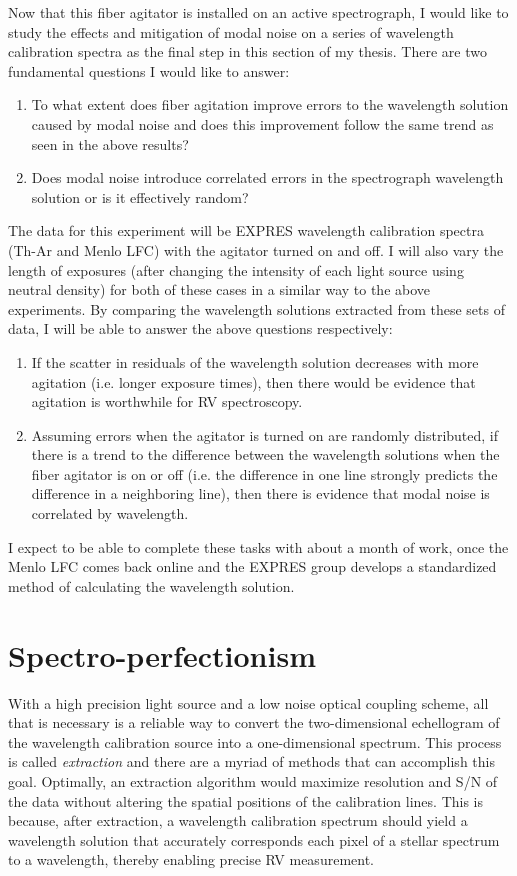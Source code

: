 \documentclass[11pt]{article}
\begin{document}
Now that this fiber agitator is installed on an active spectrograph, I would like to study the effects and mitigation of modal noise on a series of wavelength calibration spectra as the final step in this section of my thesis. There are two fundamental questions I would like to answer:
\begin{enumerate}
    \item To what extent does fiber agitation improve errors to the wavelength solution caused by modal noise and does this improvement follow the same trend as seen in the above results?
    \item Does modal noise introduce correlated errors in the spectrograph wavelength solution or is it effectively random?
\end{enumerate}
The data for this experiment will be EXPRES wavelength calibration spectra (Th-Ar and Menlo LFC) with the agitator turned on and off. I will also vary the length of exposures (after changing the intensity of each light source using neutral density) for both of these cases in a similar way to the above experiments. By comparing the wavelength solutions extracted from these sets of data, I will be able to answer the above questions respectively:
\begin{enumerate}
    \item If the scatter in residuals of the wavelength solution decreases with more agitation (i.e. longer exposure times), then there would be evidence that agitation is worthwhile for RV spectroscopy.
    \item Assuming errors when the agitator is turned on are randomly distributed, if there is a trend to the difference between the wavelength solutions when the fiber agitator is on or off (i.e. the difference in one line strongly predicts the difference in a neighboring line), then there is evidence that modal noise is correlated by wavelength.
\end{enumerate}
I expect to be able to complete these tasks with about a month of work, once the Menlo LFC comes back online and the EXPRES group develops a standardized method of calculating the wavelength solution.

\section{Spectro-perfectionism}
\label{sec:spec_perf}

With a high precision light source and a low noise optical coupling scheme, all that is necessary is a reliable way to convert the two-dimensional echellogram of the wavelength calibration source into a one-dimensional spectrum. This process is called \textit{extraction} and there are a myriad of methods that can accomplish this goal. Optimally, an extraction algorithm would maximize resolution and S/N of the data without altering the spatial positions of the calibration lines. This is because, after extraction, a wavelength calibration spectrum should yield a wavelength solution that accurately corresponds each pixel of a stellar spectrum to a wavelength, thereby enabling precise RV measurement.
\end{document}
